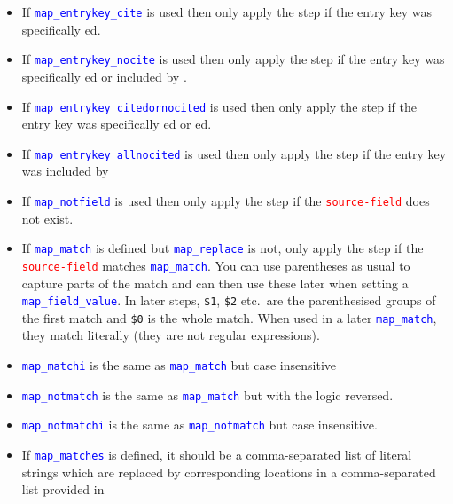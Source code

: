 \documentclass{ltxdockit}
\begin{document}
\begin{itemize}
  \textcolor{red}{\texttt{target-field}}, if defined. If
  \textcolor{blue}{\texttt{map\_final}} is set, then if there is no
  \textcolor{red}{\texttt{source-field}} field in the entry, processing of
  this  immediately terminates.
\item If \textcolor{blue}{\texttt{map\_entrykey\_cite}} is used then only apply
  the step if the entry key was specifically ed.
\item If \textcolor{blue}{\texttt{map\_entrykey\_nocite}} is used then only apply
  the step if the entry key was specifically ed or included by .
\item If \textcolor{blue}{\texttt{map\_entrykey\_citedornocited}} is used then only apply
  the step if the entry key was specifically ed or ed.
\item If \textcolor{blue}{\texttt{map\_entrykey\_allnocited}} is used then only apply
  the step if the entry key was included by 
\item If \textcolor{blue}{\texttt{map\_notfield}} is used then only apply
  the step if the \textcolor{red}{\texttt{source-field}} does not exist.
\item If \textcolor{blue}{\texttt{map\_match}} is defined but
  \textcolor{blue}{\texttt{map\_replace}} is not, only apply the
  step if the \textcolor{red}{\texttt{source-field}} matches
  \textcolor{blue}{\texttt{map\_match}}. You can use parentheses as usual
  to capture parts of the match and can then use these later when setting a \textcolor{blue}{\texttt{map\_field\_value}}.
  In later steps, \verb+$1+, \verb+$2+ etc.\ are the parenthesised groups of the first match and
  \verb+$0+ is the whole match. When used in a later \textcolor{blue}{\texttt{map\_match}},
  they match literally (they are not regular expressions).
\item \textcolor{blue}{\texttt{map\_matchi}} is the same as
  \textcolor{blue}{\texttt{map\_match}} but case insensitive
\item \textcolor{blue}{\texttt{map\_notmatch}} is the same as
  \textcolor{blue}{\texttt{map\_match}} but with the logic reversed.
\item \textcolor{blue}{\texttt{map\_notmatchi}} is the same as
  \textcolor{blue}{\texttt{map\_notmatch}} but case insensitive.
\item If \textcolor{blue}{\texttt{map\_matches}} is defined, it should be a
  comma-separated list of literal strings which are replaced by
  corresponding locations in a comma-separated list provided in

\end{itemize}
\end{document}
